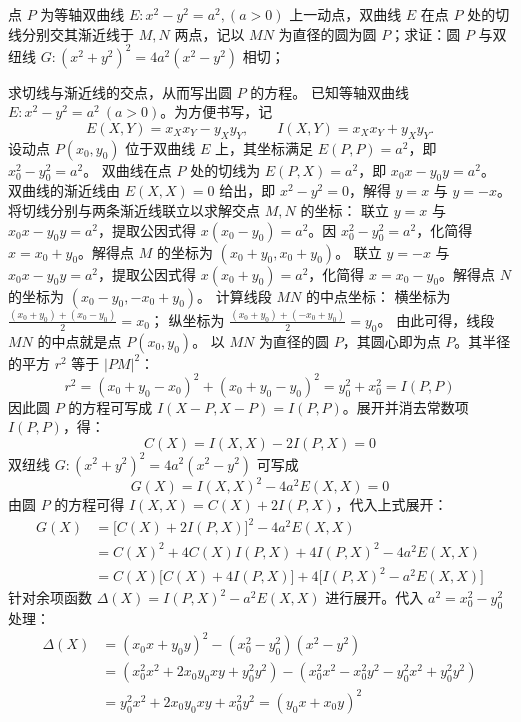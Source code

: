\begin{example}
点 $P$ 为等轴双曲线 $E: x^2 - y^2 = a^2, (a > 0)$ 上一动点，双曲线 $E$ 在点 $P$ 处的切线分别交其渐近线于 $M, N$ 两点，记以 $MN$ 为直径的圆为圆 $P$；求证：圆 $P$ 与双纽线 $G: (x^2 + y^2)^2 = 4a^2(x^2 - y^2)$ 相切；
\end{example}
\begin{solution}
求切线与渐近线的交点，从而写出圆 $P$ 的方程。
已知等轴双曲线 $E: x^2 - y^2 = a^2\ (a>0)$。为方便书写，记
\[
E(X,Y) = x_X x_Y - y_X y_Y,\qquad I(X,Y) = x_X x_Y + y_X y_Y.
\]
设动点 $P(x_0, y_0)$ 位于双曲线 $E$ 上，其坐标满足 $E(P,P) = a^2$，即 $x_0^2 - y_0^2 = a^2$。
双曲线在点 $P$ 处的切线为 $E(P,X) = a^2$，即 $x_0 x - y_0 y = a^2$。
双曲线的渐近线由 $E(X,X) = 0$ 给出，即 $x^2 - y^2 = 0$，解得 $y = x$ 与 $y = -x$。
将切线分别与两条渐近线联立以求解交点 $M, N$ 的坐标：
联立 $y = x$ 与 $x_0 x - y_0 y = a^2$，提取公因式得 $x(x_0 - y_0) = a^2$。因 $x_0^2 - y_0^2 = a^2$，化简得 $x = x_0 + y_0$。解得点 $M$ 的坐标为 $(x_0 + y_0, x_0 + y_0)$。
联立 $y = -x$ 与 $x_0 x - y_0 y = a^2$，提取公因式得 $x(x_0 + y_0) = a^2$，化简得 $x = x_0 - y_0$。解得点 $N$ 的坐标为 $(x_0 - y_0, -x_0 + y_0)$。
计算线段 $MN$ 的中点坐标：
横坐标为 $\frac{(x_0 + y_0) + (x_0 - y_0)}{2} = x_0$；
纵坐标为 $\frac{(x_0 + y_0) + (-x_0 + y_0)}{2} = y_0$。
由此可得，线段 $MN$ 的中点就是点 $P(x_0, y_0)$。
以 $MN$ 为直径的圆 $P$，其圆心即为点 $P$。其半径的平方 $r^2$ 等于 $|PM|^2$：
\[ r^2 = (x_0 + y_0 - x_0)^2 + (x_0 + y_0 - y_0)^2 = y_0^2 + x_0^2 = I(P,P) \]
因此圆 $P$ 的方程可写成 $I(X-P, X-P) = I(P,P)$。展开并消去常数项 $I(P,P)$，得：
\[ C(X) = I(X,X) - 2I(P,X) = 0 \]
双纽线 $G: (x^2 + y^2)^2 = 4a^2(x^2 - y^2)$ 可写成
\[ G(X) = I(X,X)^2 - 4a^2 E(X,X) = 0 \]
由圆 $P$ 的方程可得 $I(X,X) = C(X) + 2I(P,X)$，代入上式展开：
\begin{align*}
G(X) &= \big[ C(X) + 2I(P,X) \big]^2 - 4a^2 E(X,X) \\
&= C(X)^2 + 4C(X)I(P,X) + 4I(P,X)^2 - 4a^2 E(X,X) \\
&= C(X) \big[ C(X) + 4I(P,X) \big] + 4 \big[ I(P,X)^2 - a^2 E(X,X) \big]
\end{align*}
针对余项函数 $\Delta(X) = I(P,X)^2 - a^2 E(X,X)$ 进行展开。代入 $a^2 = x_0^2 - y_0^2$ 处理：
\begin{align*}
\Delta(X) &= (x_0 x + y_0 y)^2 - (x_0^2 - y_0^2)(x^2 - y^2) \\
&= (x_0^2 x^2 + 2x_0 y_0 x y + y_0^2 y^2) - (x_0^2 x^2 - x_0^2 y^2 - y_0^2 x^2 + y_0^2 y^2) \\
&= y_0^2 x^2 + 2x_0 y_0 x y + x_0^2 y^2 = (y_0 x + x_0 y)^2
\end{align*}

\end{solution}
